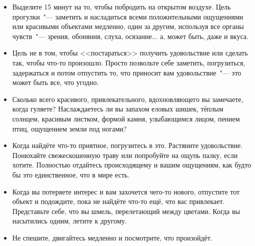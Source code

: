 \begin{itemize}
	\item Выделите 15 минут на то, чтобы побродить на открытом воздухе. Цель прогулки~"--- заметить и насладиться всеми положительными ощущениями или красивыми объектами медленно, один за другим, используя все органы чувств~"--- зрения, обоняния, слуха, осязание... а, может быть, даже и вкуса.
	
	\item Цель не в том, чтобы <<постараться>> получить удовольствие или сделать так, чтобы что-то произошло. Просто позвольте себе заметить, погрузиться, задержаться и потом отпустить то, что приносит вам удовольствие~"--- это может быть все, что угодно.
	
	\item Сколько всего красивого, привлекательного, вдохновляющего вы замечаете, когда гуляете? Наслаждаетесь ли вы запахом еловых шишек, тёплым солнцем, красивым листком, формой камня, улыбающимся лицом, пением птиц, ощущением земли под ногами?
	
	\item Когда найдёте что-то приятное, погрузитесь в это. Растяните удовольствие. Понюхайте свежескошенную траву или попробуйте на ощупь палку, если хотите. Полностью отдайтесь происходящему и вашим ощущениям, как будто бы это единственное, что в мире есть.
	
	\item Когда вы потеряете интерес и вам захочется чего-то нового, отпустите тот объект и подождите, пока не найдёте что-то ещё, что вас привлекает. Представьте себе, что вы шмель, перелетающий между цветами. Когда вы насытились одним, летите к другому.
	
	\item Не спешите, двигайтесь медленно и посмотрите, что произойдёт.
\end{itemize}

\newpage
{}

